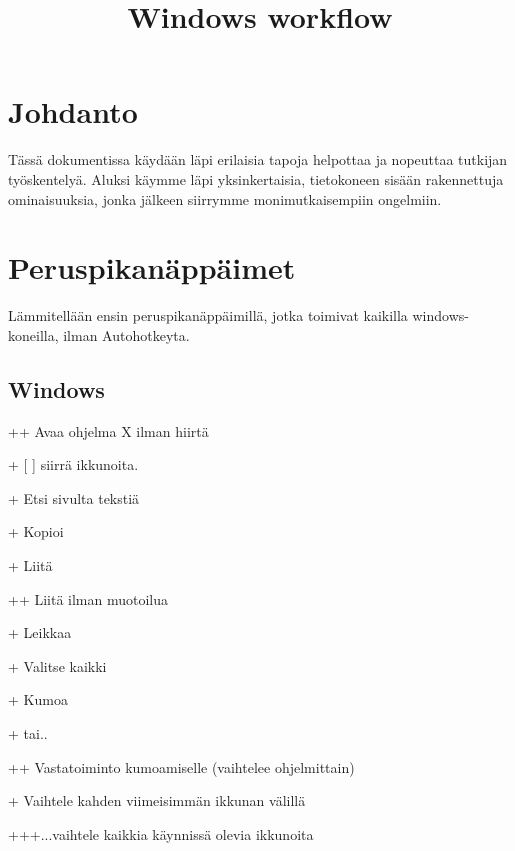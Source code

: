 \documentclass[a4paper,12pt]{scrartcl}
\title{Windows workflow}
\begin{document}
\maketitle

\tableofcontents

\newpage

\section{Johdanto}\label{Johdanto}
Tässä dokumentissa käydään läpi erilaisia tapoja helpottaa ja nopeuttaa tutkijan työskentelyä. Aluksi käymme läpi yksinkertaisia, tietokoneen sisään rakennettuja ominaisuuksia, jonka jälkeen siirrymme monimutkaisempiin ongelmiin.

\section{Peruspikanäppäimet}
\label{perus}

Lämmitellään ensin peruspikanäppäimillä, jotka toimivat kaikilla windows-koneilla, ilman Autohotkeyta.

\subsection{Windows}

++\keys{\return} Avaa ohjelma X ilman hiirtä

+ [ \keys{\arrowkeyleft} \keys{\arrowkeyright} \keys{\arrowkeyup} \keys{\arrowkeydown} ] siirrä ikkunoita. 

+ Etsi sivulta tekstiä


+ Kopioi 

+ Liitä 

+\keys{\shift}+ Liitä ilman muotoilua

+ Leikkaa 

+ Valitse kaikki

+ Kumoa

+ tai..

+\keys{\shift}+  Vastatoiminto kumoamiselle (vaihtelee ohjelmittain)

+ Vaihtele kahden viimeisimmän ikkunan välillä

+++...vaihtele kaikkia käynnissä olevia ikkunoita
\end{document}
